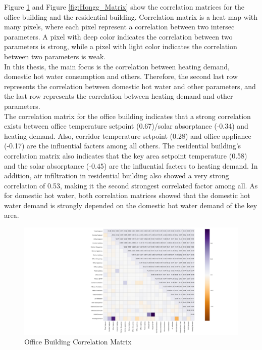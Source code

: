 \documentclass[a4paper, oneside]{discothesis}
\begin{document}
		Figure \ref{fig:Sumatra_Matrix} and Figure \ref{fig:Hongg_Matrix} show the correlation matrices for the office building and the residential building. Correlation matrix is a heat map with many pixels, where each pixel represent a correlation between two intersec parameters. A pixel with deep color indicates the correlation between two parameters is strong, while a pixel with light color indicates the correlation between two parameters is weak.\\
		
		In this thesis, the main focus is the correlation between heating demand, domestic hot water consumption and others. Therefore, the second last row represents the correlation between domestic hot water and other parameters, and the last row represents the correlation between heating demand and other parameters.\\
		
		The correlation matrix for the office building indicates that a strong correlation exists between office temperature setpoint (0.67)/solar absorptance (-0.34) and heating demand. Also, corridor temperature setpoint (0.28) and office appliance (-0.17) are the influential facters among all others. The residential building's correlation matrix also indicates that the key area setpoint temperature (0.58) and the solar absorptance (-0.45) are the influential facters to heating demand. In addition, air infiltration in residential building also showed a very strong correlation of 0.53, making it the second strongest correlated factor among all. As for domestic hot water, both correlation matrices showed that the domestic hot water demand is strongly depended on the domestic hot water demand of the key area.

		
	    \begin{figure}[H]
		\centering
		\includegraphics[scale=0.6]{figures/matrix_office.pdf}
		\caption{Office Building Correlation Matrix}
		\label{fig:Sumatra_Matrix}
		\end{figure}
			
\end{document}
